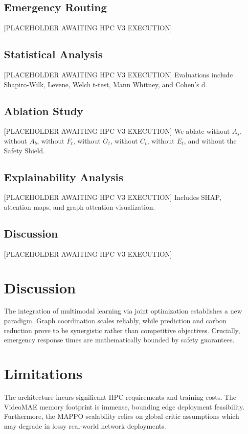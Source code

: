 \documentclass{ieeeaccess}
\begin{document}
\subsection{Emergency Routing}
[PLACEHOLDER AWAITING HPC V3 EXECUTION]

\subsection{Statistical Analysis}
[PLACEHOLDER AWAITING HPC V3 EXECUTION]
Evaluations include Shapiro-Wilk, Levene, Welch t-test, Mann Whitney, and Cohen's d.

\subsection{Ablation Study}
[PLACEHOLDER AWAITING HPC V3 EXECUTION]
We ablate without $A_s$, without $A_b$, without $F_t$, without $G_t$, without $C_t$, without $E_t$, and without the Safety Shield.

\subsection{Explainability Analysis}
[PLACEHOLDER AWAITING HPC V3 EXECUTION]
Includes SHAP, attention maps, and graph attention visualization.

\subsection{Discussion}
[PLACEHOLDER AWAITING HPC V3 EXECUTION]

\section{Discussion}
\label{sec:discussion_main}
The integration of multimodal learning via joint optimization establishes a new paradigm. Graph coordination scales reliably, while prediction and carbon reduction prove to be synergistic rather than competitive objectives. Crucially, emergency response times are mathematically bounded by safety guarantees.

\section{Limitations}
\label{sec:limitations}
The architecture incurs significant HPC requirements and training costs. The VideoMAE memory footprint is immense, bounding edge deployment feasibility. Furthermore, the MAPPO scalability relies on global critic assumptions which may degrade in lossy real-world network deployments.
\end{document}
